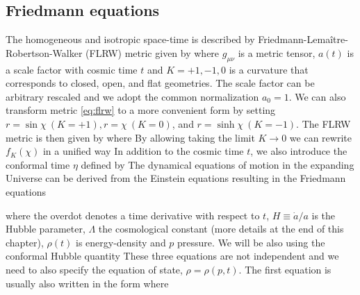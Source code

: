 \subsection{Friedmann equations}
The homogeneous and isotropic space-time is described by Friedmann-Lema\^{i}tre-Robertson-Walker (FLRW) metric given by
where $g_{\mu\nu}$ is a metric tensor, $a(t)$ is a scale factor with cosmic time $t$ and $K=+1,-1,0$ is a curvature that corresponds to closed, open, and flat geometries. The scale factor can be arbitrary rescaled and we adopt the common normalization $a_0=1$. We can also transform metric \eqref{eq:flrw} to a more convenient form by setting $r=\sin\chi\ (K=+1),r=\chi\ (K=0)$, and $r=\sinh\chi\ (K=-1)$. The FLRW metric is then given by
where
By allowing taking the limit $K\to0$ we can rewrite $f_K(\chi)$ in a unified way
In addition to the cosmic time $t$, we also introduce the conformal time $\eta$ defined by
The dynamical equations of motion in the expanding Universe can be derived from the Einstein equations resulting in the Friedmann equations

where the overdot denotes a time derivative with respect to $t$, $H\equiv\dot a/a$ is the Hubble parameter, $\Lambda$ the cosmological constant (more details at the end of this chapter), $\rho(t)$ is energy-density and $p$ pressure. We will be also using the conformal Hubble quantity
These three equations are not independent and we need to also specify the equation of state, $\rho=\rho(p,t)$. The first equation is usually also written in the form
where

